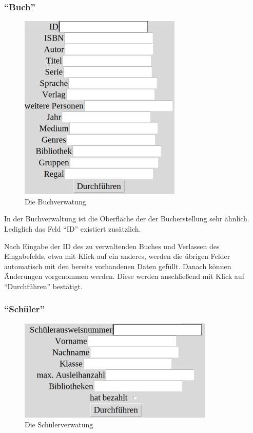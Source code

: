 \subsubsection{``Buch''}
\label{subsubsec:detail:edit:book}
\begin{figure}\includegraphics{images/gui2/edit_book.jpg}\caption{Die Buchverwatung}\label{fig:edit_book}\end{figure}

In der Buchverwaltung ist die Oberfläche der der Bucherstellung sehr ähnlich. Lediglich das Feld ``ID'' existiert zusätzlich.

Nach Eingabe der ID des zu verwaltenden Buches und Verlassen des Eingabefelds, etwa mit Klick auf ein anderes, werden die übrigen Felder automatisch mit den bereits vorhandenen Daten gefüllt.
Danach können Änderungen vorgenommen werden. Diese werden anschließend mit Klick auf ``Durchführen'' bestätigt.


\subsubsection{``Schüler''}
\label{subsubsec:detail:edit:person}
\begin{figure}\includegraphics{images/gui2/edit_person.jpg}\caption{Die Schülerverwatung}\label{fig:edit_person}\end{figure}

